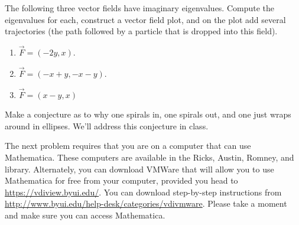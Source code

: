 \begin{problem}
The following three vector fields have imaginary eigenvalues. Compute the eigenvalues for each, construct a vector field plot, and on the plot add several trajectories (the path followed by a particle that is dropped into this field).
\begin{enumerate}
 \item $\vec F = (-2y,x)$. 
 \item $\vec F = (-x+y, -x-y)$.
 \item $\vec F = (x-y, x)$ 
\end{enumerate}
Make a conjecture as to why one spirals in, one spirals out, and one just wraps around in ellipses. We'll address this conjecture in class.
\end{problem}

The next problem requires that you are on a computer that can use Mathematica. These computers are available in the Ricks, Austin, Romney, and library.  Alternately, you can download VMWare that will allow you to use Mathematica for free from your computer, provided you head to \url{https://vdiview.byui.edu/}. You can download step-by-step instructions from \url{http://www.byui.edu/help-desk/categories/vdivmware}. Please take a moment and make sure you can access Mathematica.

